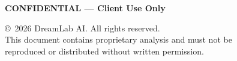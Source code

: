 \begin{titlepage}
\begin{center}
\vfill

\begin{tcolorbox}[
  colback=dreamlab-primary!10,
  colframe=dreamlab-primary,
  width=0.7\textwidth,
  halign=center,
  sharp corners,
  boxrule=1pt
]
  \centering\sffamily\bfseries\color{dreamlab-primary}
  CONFIDENTIAL --- Client Use Only
\end{tcolorbox}

\vspace{5mm}

{\small\sffamily\textcolor{dreamlab-grey}{%
  \copyright\ 2026 DreamLab AI. All rights reserved.\\
  This document contains proprietary analysis and must not be\\
  reproduced or distributed without written permission.}}

\end{center}
\restoregeometry
\end{titlepage}
